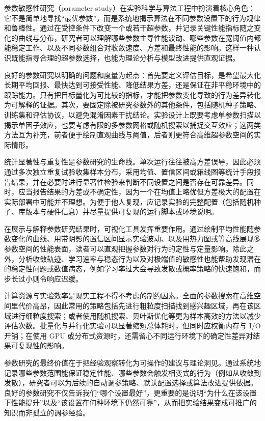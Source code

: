 \documentclass[11pt]{ctexart}
\begin{document}
参数敏感性研究（parameter
study）在实验科学与算法工程中扮演着核心角色：它不是简单地寻找``最优参数''，而是系统地揭示算法在不同参数设置下的行为规律和鲁棒性。通过在受控条件下改变一个或若干超参数，并记录关键性能指标随之变化的曲线与分布，研究者可以理解哪些参数主导性能波动、哪些参数在宽阈值内都能稳定工作、以及不同参数组合对收敛速度、方差和最终性能的影响。这样一种认识既能指导合理的超参数选择，也能为理论分析与模型改进提供直观证据。

良好的参数研究以明确的问题和度量为起点：首先要定义评估目标，是希望最大化长期平均回报、最快达到可接受性能、降低结果方差，还是保证在非平稳环境中的跟踪能力。只有把目标量化为可比较的指标，才能把参数变化导致的行为差异转化为可解释的证据。其次，要固定除被研究参数外的其他条件，包括随机种子策略、训练集和评估协议，以避免混淆因素干扰结论。实验设计上既要考虑单参数扫描以揭示单因子效应，也要考虑有限的多参数网格或随机搜索以捕捉交互效应；这两类方法互为补充，前者便于绘制直观曲线与阈值，后者则更符合高维超参数空间的实际情形。

统计显著性与重复性是参数研究的生命线。单次运行往往被高方差误导，因此必须通过多次独立重复试验收集样本分布，采用均值、置信区间或箱线图等统计手段报告结果，并在必要时进行显著性检验来判断不同设置之间是否存在可靠差异。同时，应当报告结果的方差或不确定性，因为一个在均值上略优但方差极大的配置在实际部署中可能并不理想。为便于他人复现，应记录实验的完整配置（包括随机种子、库版本与硬件信息）并尽量提供可复现的运行脚本或环境说明。

在展示与解释参数研究结果时，可视化工具发挥重要作用。通过绘制平均性能随参数变化的曲线、用带阴影的置信区间显示实验波动、以及用热力图或等高线展现多参数空间的性能表面，读者可以直观把握参数对行为的定性与定量影响。除此之外，分析收敛轨迹、学习速率与稳态行为以及对极端值的敏感性也能帮助发现潜在的稳定性问题或数值病态，例如学习率过大会导致发散或概率策略的快速饱和，而步长过小则令响应迟缓。

计算资源与实验效率是现实工程不得不考虑的制约因素。全面的参数搜索在高维空间里代价高昂，因此常用的策略包括先进行粗粒度扫描找到感兴趣区域，再在该区域进行细粒度搜索；或者使用随机搜索、贝叶斯优化等更为样本高效的方法以减少评估次数。批量化与并行化实验可以显著缩短总体耗时，但同时应权衡内存与
I/O 开销；在使用 GPU
或分布式资源时，还需留心不同运行环境下的确定性差异对结果可复现性的影响。

参数研究的最终价值在于把经验观察转化为可操作的建议与理论洞见。通过系统地记录哪些参数范围能保证稳定性能、哪些参数会触发相变式的行为（例如从收敛到发散），研究者可以为后续的自动调参策略、默认配置选择或算法改进提供依据。良好的参数研究不仅告诉我们``哪个设置最好''，更重要的是说明``为什么在该设置下性能提升''以及``该设置在何种环境下仍然可靠''，从而把实验结果变成可推广的知识而非孤立的调参经验。
\end{document}
